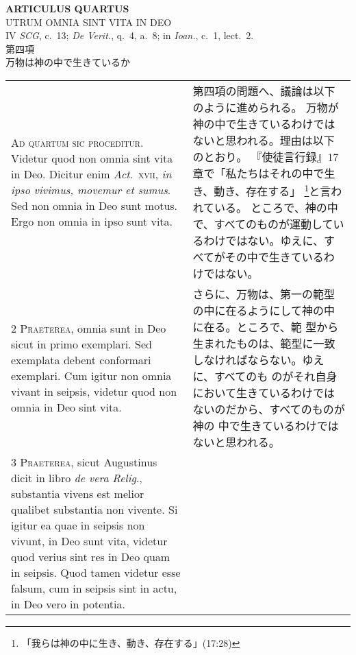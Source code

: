 \documentclass[10pt]{jsarticle} %
\begin{document}
\begin{center}
 {\Large {\bf ARTICULUS QUARTUS}}\\
 {\large UTRUM OMNIA SINT VITA IN DEO}\\
 {\footnotesize IV {\itshape SCG}, c.~13; {\itshape De Verit.}, q.~4,
 a.~8; in {\itshape Ioan.}, c.~1, lect.~2.}\\
 {\Large 第四項\\万物は神の中で生きているか}
\end{center}

\begin{longtable}{p{21em}p{21em}}

{\huge A}{\scshape d quartum sic proceditur}. Videtur quod non
 omnia sint vita in Deo. Dicitur enim {\itshape Act}.~{\scshape xvii}, {\itshape in ipso vivimus,
 movemur et sumus}. Sed non omnia in Deo sunt motus. Ergo non omnia in
 ipso sunt vita.


&

第四項の問題へ、議論は以下のように進められる。
万物が神の中で生きているわけではないと思われる。理由は以下のとおり。
『使徒言行録』17章で「私たちはそれの中で生き、動き、存在する」
 \footnote{「我らは神の中に生き、動き、存在する」(17:28)}と言われている。
 ところで、神の中で、すべてのものが運動しているわけではない。ゆえに、す
 べてがその中で生きているわけではない。

\\




{\scshape 2 Praeterea}, omnia sunt in Deo sicut in primo
 exemplari. Sed exemplata debent conformari exemplari. Cum igitur non
 omnia vivant in seipsis, videtur quod non omnia in Deo sint vita.


&

さらに、万物は、第一の範型の中に在るようにして神の中に在る。ところで、範
 型から生まれたものは、範型に一致しなければならない。ゆえに、すべてのも
 のがそれ自身において生きているわけではないのだから、すべてのものが神の
 中で生きているわけではないと思われる。


\\




{\scshape 3 Praeterea}, sicut Augustinus dicit in libro
 {\itshape de vera Relig}., substantia vivens est melior qualibet substantia non
 vivente. Si igitur ea quae in seipsis non vivunt, in Deo sunt vita,
 videtur quod verius sint res in Deo quam in seipsis. Quod tamen videtur
 esse falsum, cum in seipsis sint in actu, in Deo vero in potentia.



\end{longtable}
\end{document}

